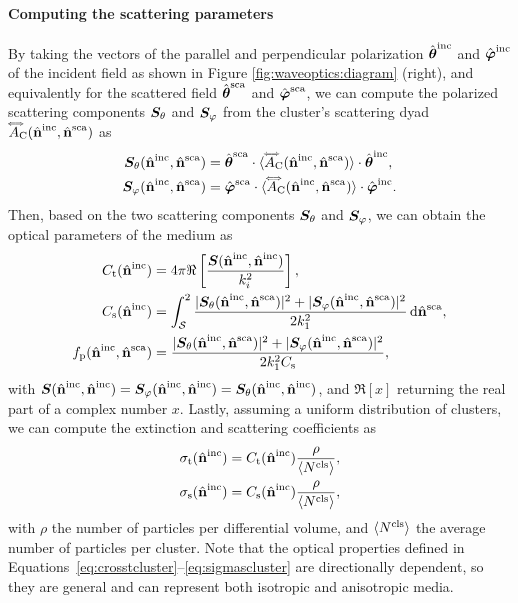 \paragraph{Computing the scattering parameters}
By taking the vectors of the parallel and perpendicular polarization ${\hat{\bm\theta}}^\mathrm{inc}$ and ${\hat{\bm\varphi}}^\mathrm{inc}$ of the incident field as shown in Figure \ref{fig:waveoptics:diagram} (right), and equivalently for the scattered field ${\hat{\bm\theta}}^\mathrm{sca}$ and ${\hat{\bm\varphi}}^\mathrm{sca}$, we can compute the polarized scattering components $\bm{S}_\theta$ and $\bm{S}_\varphi$ from the cluster's scattering dyad ${\accentset{\Longleftrightarrow}{A}}_{\mathrm{C}}({\hat{\mathbf{n}}}^\mathrm{inc},{\hat{\mathbf{n}}}^\mathrm{sca})$ as
\begin{align}
  \bm{S}_\theta({\hat{\mathbf{n}}}^\mathrm{inc},{\hat{\mathbf{n}}}^\mathrm{sca}) &= {\hat{\bm\theta}}^\mathrm{sca} \cdot {\langle {\accentset{\Longleftrightarrow}{A}}_{\mathrm{C}}({\hat{\mathbf{n}}}^\mathrm{inc},{\hat{\mathbf{n}}}^\mathrm{sca}) \rangle} \cdot {\hat{\bm\theta}}^\mathrm{inc}, \nonumber \\
  \bm{S}_\varphi({\hat{\mathbf{n}}}^\mathrm{inc},{\hat{\mathbf{n}}}^\mathrm{sca}) &= {\hat{\bm\varphi}}^\mathrm{sca} \cdot {\langle {\accentset{\Longleftrightarrow}{A}}_{\mathrm{C}}({\hat{\mathbf{n}}}^\mathrm{inc},{\hat{\mathbf{n}}}^\mathrm{sca}) \rangle} \cdot {\hat{\bm\varphi}}^\mathrm{inc}.
\end{align}
Then, based on the two scattering components $\bm{S}_\theta$ and $\bm{S}_\varphi$, we can obtain the optical parameters of the medium as
\begin{align}
    \label{eq:crosstcluster}
    \Ct(\hatbfni) &= 4\pi \Re\left[\frac{\bmS(\hatbfni,\hatbfni)}{k_i^2}\right], \\
    \label{eq:crossscluster}
    \Cs(\hatbfni) &=\int_\calSS \frac{|\bmStheta(\hatbfnis)|^2+|\bmSphi(\hatbfnis)|^2}{2k_1^2} \intd \hatbfns, \\
    \label{eq:phasecluster}
    \fp(\hatbfnis) &= \frac{|\bmStheta(\hatbfnis)|^2+|\bmSphi(\hatbfnis)|^2}{2k_1^2\Cs},
\end{align}
with $\bm{S}({\hat{\mathbf{n}}}^\mathrm{inc},{\hat{\mathbf{n}}}^\mathrm{inc})=\bm{S}_\varphi({\hat{\mathbf{n}}}^\mathrm{inc},{\hat{\mathbf{n}}}^\mathrm{inc})=\bm{S}_\theta({\hat{\mathbf{n}}}^\mathrm{inc},{\hat{\mathbf{n}}}^\mathrm{inc})$, and $\Re[x]$ returning the real part of a complex number $x$. Lastly, assuming a uniform distribution of clusters, we can compute the extinction and scattering coefficients as
\begin{align}
    \label{eq:sigmatcluster}
    \sigmat(\hatbfni) &= \Ct(\hatbfni) \frac{\rho}{\EV{\Ncls}}, \\
    \label{eq:sigmascluster}
    \sigmas(\hatbfni) &= \Cs(\hatbfni) \frac{\rho}{\EV{\Ncls}},
\end{align}
with $\rho$ the number of particles per differential volume, and ${\langle N^\mathrm{cls} \rangle}$ the average number of particles per cluster. Note that the optical properties defined in Equations~\eqref{eq:crosstcluster}--\eqref{eq:sigmascluster} are directionally dependent, so they are general and can represent both isotropic and anisotropic media. 


